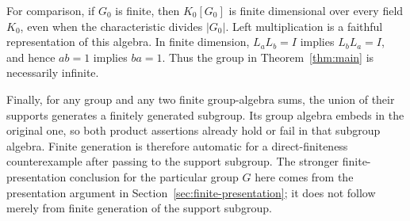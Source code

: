 For comparison, if $G_0$ is finite, then $K_0[G_0]$ is finite dimensional over every field $K_0$, even when the characteristic divides $|G_0|$. Left multiplication is a faithful representation of this algebra. In finite dimension, $L_aL_b=I$ implies $L_bL_a=I$, and hence $ab=1$ implies $ba=1$. Thus the group in Theorem~\ref{thm:main} is necessarily infinite.

Finally, for any group and any two finite group-algebra sums, the union of their supports generates a finitely generated subgroup. Its group algebra embeds in the original one, so both product assertions already hold or fail in that subgroup algebra. Finite generation is therefore automatic for a direct-finiteness counterexample after passing to the support subgroup. The stronger finite-presentation conclusion for the particular group $G$ here comes from the presentation argument in Section~\ref{sec:finite-presentation}; it does not follow merely from finite generation of the support subgroup.
